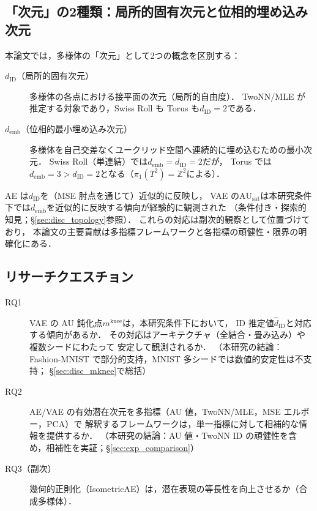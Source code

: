 \documentclass[11pt,a4paper]{jsarticle}
\newcommand{\dID}{d_{\mathrm{ID}}}
\newcommand{\AUsat}{\mathrm{AU}_{\mathrm{sat}}}
\newcommand{\mknee}{m^{\mathrm{knee}}}
\newcommand{\demb}{d_{\mathrm{emb}}}
\begin{document}
\subsection{「次元」の2種類：局所的固有次元と位相的埋め込み次元}\label{sec:intro_dim}

本論文では，多様体の「次元」として2つの概念を区別する：

\begin{description}
  \item[$\dID$（局所的固有次元）]
        多様体の各点における接平面の次元（局所的自由度）．
        TwoNN/MLE が推定する対象であり，Swiss Roll も Torus も$\dID = 2$である．
  \item[$\demb$（位相的最小埋め込み次元）]
        多様体を自己交差なくユークリッド空間へ連続的に埋め込むための最小次元．
        Swiss Roll（単連結）では$\demb = \dID = 2$だが，
        Torus では$\demb = 3 > \dID = 2$となる（$\pi_1(T^2) = \mathbb{Z}^2$による）．
\end{description}

AE は$\dID$を（MSE 肘点を通じて）近似的に反映し，
VAE の$\AUsat$は本研究条件下では$\demb$を近似的に反映する傾向が経験的に観測された
（条件付き・探索的知見；§\ref{sec:disc_topology}参照）．
これらの対応は副次的観察として位置づけており，
本論文の主要貢献は多指標フレームワークと各指標の頑健性・限界の明確化にある．

\subsection{リサーチクエスチョン}\label{sec:intro_rq}

\begin{description}
  \item[RQ1] VAE の AU 鈍化点$\mknee$は，本研究条件下において，
             ID 推定値$\hat{d}_\mathrm{ID}$と対応する傾向があるか．
             その対応はアーキテクチャ（全結合・畳み込み）や複数シードにわたって
             安定して観測されるか．
             （本研究の結論：Fashion-MNIST で部分的支持，MNIST 多シードでは数値的安定性は不支持；
             §\ref{sec:disc_mknee}で総括）
  \item[RQ2] AE/VAE の有効潜在次元を多指標（AU 値，TwoNN/MLE，MSE エルボー，PCA）で
             解釈するフレームワークは，単一指標に対して相補的な情報を提供するか．
             （本研究の結論：AU 値・TwoNN ID の頑健性を含め，相補性を実証；§\ref{sec:exp_comparison}）
  \item[RQ3（副次）] 幾何的正則化（IsometricAE）は，潜在表現の等長性を向上させるか（合成多様体）．
\end{description}
\end{document}
